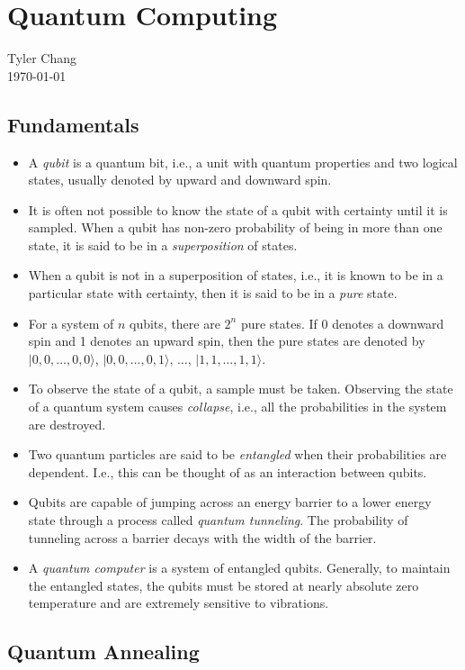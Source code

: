 \documentclass[12pt]{article}
\begin{document}
\section*{Quantum Computing}
Tyler Chang\\
\today

\subsection*{Fundamentals}

\begin{itemize}
	\item A {\it qubit} is a quantum bit, i.e., a unit with quantum
		properties and
		two logical states, usually denoted by upward and downward
		spin.
	\item It is often not possible to know the state of a qubit
		with certainty until it is sampled. When a qubit
		has non-zero probability of being in more than one state,
		it is said to be in a {\it superposition} of states.
	\item When a qubit is not in a superposition of states, i.e., it
		is known to be in a particular state with certainty, then
		it is said to be in a {\it pure} state.
	\item For a system of $n$ qubits, there are $2^n$ pure states.
		If 0 denotes a downward spin and 1 denotes an upward spin,
		then the pure states are denoted by
		$|0,0,\ldots,0,0\rangle$, $|0,0,\ldots,0,1\rangle$, $\ldots$,
		$|1,1,\ldots,1,1\rangle$.
	\item To observe the state of a qubit, a sample must be taken.
		Observing the state of a quantum system causes
		{\it collapse}, i.e., all the probabilities in the system
		are destroyed.
	\item Two quantum particles are said to be {\it entangled} when
		their probabilities are dependent. I.e., this can be thought
		of as an interaction between qubits.
	\item Qubits are capable of jumping across an energy barrier to
		a lower energy state through a process called 
		{\it quantum tunneling}. The probability of tunneling across
		a barrier decays with the width of the barrier.
	\item A {\it quantum computer} is a system of entangled qubits.
		Generally, to maintain the entangled states, the qubits
		must be stored at nearly absolute zero temperature and
		are extremely sensitive to vibrations.
\end{itemize}

\subsection*{Quantum Annealing}
\end{document}

